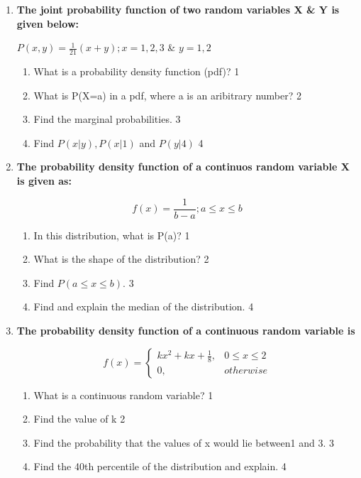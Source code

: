 \documentclass[a4paper,oneside, margin=1.4in]{book}
\begin{document}
\begin{enumerate}
 \item
	  \textbf{The joint probability function of two random variables X \& Y is given below:}

\begin{center}
$P(x,y) = \frac{1}{21}(x+y); x=1,2,3$ \& $y = 1,2$ 
\end{center}
  
  \begin{enumerate}
    \item
	What is a probability density function (pdf)? \hfill 1
    \item
	What is P(X=a) in a pdf, where a is an aribitrary number? \hfill 2
    \item  
	Find the marginal probabilities. \hfill 3
    \item
	Find $P(x \vert y), P(x \vert 1)$ and $P(y|4)$ \hfill 4
  \end{enumerate}
  
  \item
	  \textbf{The probability density function of a continuos random variable X is given as:}
	  
	  $$f(x) = \frac 1 {b-a}; a\le x\le b$$
  
  \begin{enumerate}
    \item
	In this distribution, what is P(a)? \hfill 1
    \item
    What is the shape of the distribution? \hfill 2	
    \item
	Find $P( a\le x\le b)$. \hfill 3
      \item
	Find and explain the median of the distribution. \hfill 4
  \end{enumerate}

 \item
  \textbf{The probability density function of a continuous random variable is}

$$
  f(x) =
\begin{cases}
kx^2+kx+ \frac 18,  & 0 \le x \le 2 \\
0, & otherwise
\end{cases}
$$

  \begin{enumerate}
    \item
	What is a continuous random variable? \hfill 1
    \item
    	Find the value of k \hfill 2
    \item
    	Find the probability that the values of x would lie between1 and 3. \hfill 3
     \item
     	Find the 40th percentile of the distribution and explain.  \hfill 4
  \end{enumerate}
  \end{enumerate}
\end{document}
